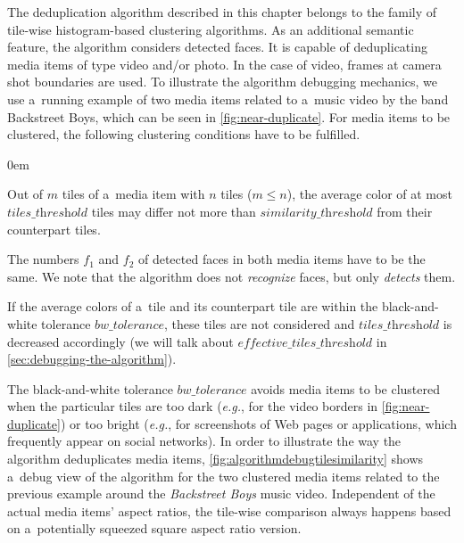 The deduplication algorithm described in this chapter
belongs to the family of tile-wise histogram-based clustering algorithms.
As an additional semantic feature, the algorithm considers detected faces.
It is capable of deduplicating media items of type video and/or photo.
In the case of video, frames at camera shot boundaries are used.
To illustrate the algorithm debugging mechanics,
we use a~running example of two media items related to a~music video by the
band Backstreet Boys, which can be seen in \autoref{fig:near-duplicate}.
For media items to be clustered,
the following clustering conditions have to be fulfilled.

\begin{description}
  \itemsep0em
  \item[Cond.~1] Out of $m$ tiles of a~media item with $n$ tiles ($m \leq n$),
    the average color of at most $\textit{tiles\_threshold}$ tiles
    may differ not more than $\textit{similarity\_threshold}$
    from their counterpart tiles.
  \item[Cond.~2] The numbers $f_1$ and $f_2$ of detected faces
    in both media items have to be the same.
    We note that the algorithm does not \emph{recognize} faces,
    but only \emph{detects} them.
  \item[Cond.~3] If the average colors of a~tile and its counterpart tile
    are within the black-and-white tolerance $\textit{bw\_tolerance}$,
    these tiles are not considered and $\textit{tiles\_threshold}$
    is decreased accordingly (we will talk about $\textit{effective\_tiles\_threshold}$
    in \autoref{sec:debugging-the-algorithm}).
\end{description}

The black-and-white tolerance $\textit{bw\_tolerance}$ avoids media items
to be clustered when the particular tiles are too dark (\emph{e.g.},
for the video borders in \autoref{fig:near-duplicate}) or too bright (\emph{e.g.},
for screenshots of Web pages or applications, which frequently appear on social networks).
In order to illustrate the way the algorithm deduplicates media items,
\autoref{fig:algorithmdebugtilesimilarity} shows a~debug view of the algorithm
for the two clustered media items related to the previous example
around the \emph{Backstreet Boys} music video.
Independent of the actual media items' aspect ratios,
the tile-wise comparison always happens based on
a~potentially squeezed square aspect ratio version.

